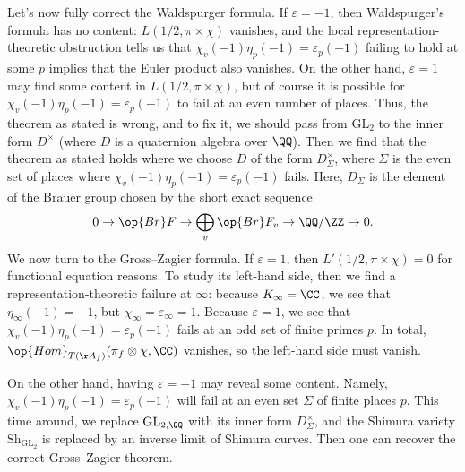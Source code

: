 \documentclass[../notes.tex]{subfiles}
\begin{document}
Let's now fully correct the Waldspurger formula. If $\varepsilon=-1$, then Waldspurger's formula has no content: $L(1/2,\pi\times\chi)$ vanishes, and the local represen\-tation-theoretic obstruction tells us that $\chi_v(-1)\eta_p(-1)=\varepsilon_p(-1)$ failing to hold at some $p$ implies that the Euler product also vanishes. On the other hand, $\varepsilon=1$ may find some content in $L(1/2,\pi\times\chi)$, but of course it is possible for $\chi_v(-1)\eta_p(-1)=\varepsilon_p(-1)$ to fail at an even number of places. Thus, the theorem as stated is wrong, and to fix it, we should pass from $\mathrm{GL}_2$ to the inner form $D^\times$ (where $D$ is a quaternion algebra over $\QQ$). Then we find that the theorem as stated holds where we choose $D$ of the form $D_\Sigma^\times$, where $\Sigma$ is the even set of places where $\chi_v(-1)\eta_p(-1)=\varepsilon_p(-1)$ fails. Here, $D_\Sigma$ is the element of the Brauer group chosen by the short exact sequence
\[0\to\op{Br}F\to\bigoplus_v\op{Br}F_v\to\QQ/\ZZ\to0.\]
We now turn to the Gross--Zagier formula. If $\varepsilon=1$, then $L'(1/2,\pi\times\chi)=0$ for functional equation reasons. To study its left-hand side, then we find a representation-theoretic failure at $\infty$: because $K_\infty=\CC$, we see that $\eta_\infty(-1)=-1$, but $\chi_\infty=\varepsilon_\infty=1$. Because $\varepsilon=1$, we see that $\chi_v(-1)\eta_p(-1)=\varepsilon_p(-1)$ fails at an odd set of finite primes $p$. In total, $\op{Hom}_{T(\AA_f)}(\pi_f\otimes\chi,\CC)$ vanishes, so the left-hand side must vanish.

On the other hand, having $\varepsilon=-1$ may reveal some content. Namely, $\chi_v(-1)\eta_p(-1)=\varepsilon_p(-1)$ will fail at an even set $\Sigma$ of finite places $p$. This time around, we replace $\mathrm{GL}_{2,\QQ}$ with its inner form $D_\Sigma^\times$, and the Shimura variety $\mathrm{Sh}_{\mathrm{GL}_2}$ is replaced by an inverse limit of Shimura curves. Then one can recover the correct Gross--Zagier theorem.
\end{document}

